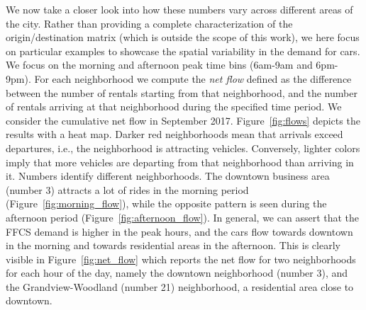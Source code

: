 We now take a closer look into  how these numbers vary across 
different areas of the city. Rather than providing a complete characterization of the origin/destination matrix (which is outside the scope of this work), we here focus on particular examples to showcase the spatial variability in the demand for cars. We focus on  the morning and afternoon peak time bins (6am-9am and 6pm-9pm). 
For each neighborhood we compute the \textit{net flow} defined as the difference between the number of rentals starting from that neighborhood, and the number of rentals arriving at that neighborhood during the specified time period. We consider the cumulative net flow in September 2017. 
Figure~\ref{fig:flows} depicts the results with a heat map. Darker red neighborhoods mean that arrivals exceed departures, i.e., the neighborhood is attracting vehicles. Conversely, lighter colors imply that more vehicles are departing from that neighborhood than arriving in it. Numbers identify different neighborhoods.
The downtown business area (number 3) attracts a lot of rides in the morning period (Figure~\ref{fig:morning_flow}), while the opposite pattern is seen during the afternoon period (Figure~\ref{fig:afternoon_flow}). 
In general, we can assert that the FFCS demand is higher in the peak hours, and the cars flow towards downtown in the morning and towards residential areas in the afternoon. 
This is clearly visible in Figure~\ref{fig:net_flow} which reports the net flow for two neighborhoods for each hour of the day, namely the downtown neighborhood (number 3), and the Grandview-Woodland (number 21) neighborhood, a residential area close to downtown.

